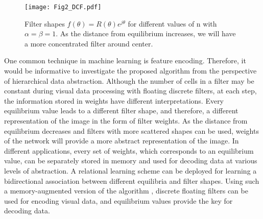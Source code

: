\documentclass[journal]{IEEEtran}
\begin{document}
\begin{figure}
\begin{center}
\texttt{[image: Fig2\_DCF.pdf]}    
\caption{Filter shapes $f(\theta)=R(\theta) e^{j\theta}$  for different values of n with $\alpha= \beta=1$. As the distance from equilibrium increases, we will have a more concentrated filter around center.} 
\label{Filters}
\end{center}
\end{figure}

One common technique in machine learning is feature encoding. Therefore, it would be informative to investigate the proposed algorithm from the perspective of hierarchical data abstraction. Although the number of cells in a filter may be constant during visual data processing with floating discrete filters, at each step, the information stored in weights have different interpretations. Every equilibrium value leads to a different filter shape, and therefore, a different representation of the image in the form of filter weights. As the distance from equilibrium decreases and filters with more scattered shapes can be used, weights of the network will provide a more abstract representation of the image. In different applications, every set of weights, which corresponds to an equilibrium value, can be separately stored in memory and used for decoding data at various levels of abstraction. A relational learning scheme can be deployed for learning a bidirectional association between different equilibria and filter shapes. Using such a memory-augmented version of the algorithm \cite{graves2016hybrid}, discrete floating filters can be used for encoding visual data, and equilibrium values provide the key for decoding data.
\end{document}

